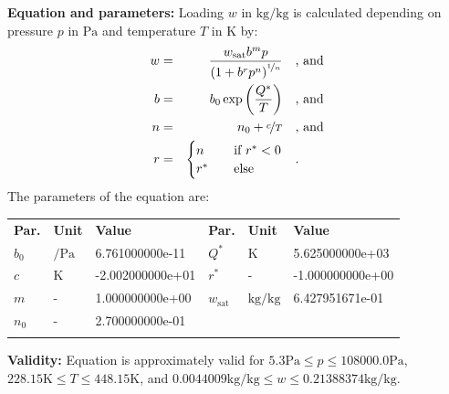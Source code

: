 \textbf{Equation and parameters:}
\newline
%
Loading $w$ in $\si{\kilogram\per\kilogram}$ is calculated depending on pressure $p$ in $\si{\pascal}$ and temperature $T$ in $\si{\kelvin}$ by:
%
\begin{equation*}
\begin{split}
w &=& \frac{w_\mathrm{sat} b^{m} p}{\left( 1 + b^{r} p^{n} \right)^{\nicefrac{1}{n}}} & \quad\text{, and} \\
b &=& b_0 \exp\left( \frac{Q^{*}}{T} \right) & \quad\text{, and} \\
n &=& n_0 + \nicefrac{c}{T} & \quad\text{, and} \\
r &=& \begin{cases} n & \quad \text{if } r^{*} < 0 \\ r^{*}  & \quad \text{else} \end{cases} & \quad\text{.}
\end{split}
\end{equation*}
%
The parameters of the equation are:
%
\begin{longtable}[l]{lll|lll}
\toprule
\addlinespace
\textbf{Par.} & \textbf{Unit} & \textbf{Value} &	\textbf{Par.} & \textbf{Unit} & \textbf{Value} \\
\addlinespace
\midrule
\endhead

\bottomrule
\endfoot
\bottomrule
\endlastfoot
\addlinespace

$b_0$ & $\si{\per\pascal}$ & 6.761000000e-11 & $Q^{*}$ & $\si{\kelvin}$ & 5.625000000e+03 \\
$c$ & $\si{\kelvin}$ & -2.002000000e+01 & $r^{*}$ & - & -1.000000000e+00 \\
$m$ & - & 1.000000000e+00 & $w_\mathrm{sat}$ & $\si{\kilogram\per\kilogram}$ & 6.427951671e-01 \\
$n_0$ & - & 2.700000000e-01 & & & \\

\addlinespace\end{longtable}

\textbf{Validity:}
\newline
Equation is approximately valid for $5.3 \si{\pascal} \leq p \leq 108000.0 \si{\pascal}$,  $228.15 \si{\kelvin} \leq T \leq 448.15 \si{\kelvin}$, and $0.0044009 \si{\kilogram\per\kilogram} \leq w \leq 0.21388374 \si{\kilogram\per\kilogram}$.
\newline

